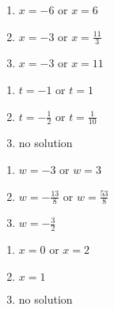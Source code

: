 \documentclass{ximera}
\begin{document}
\begin{multicols}{3}
\begin{enumerate}

\setcounter{enumi}{\value{HW}}

\item  $x = -6$ or $x=6$

\item $x = -3$ or $x= \frac{11}{3}$

\item $x = -3$ or $x= 11$

\setcounter{HW}{\value{enumi}}
\end{enumerate}
\end{multicols}

\begin{multicols}{3}
\begin{enumerate}
\setcounter{enumi}{\value{HW}}

\item  $t = -1$ or $t= 1$

\item $t=-\frac{1}{2}$ or $t= \frac{1}{10}$

\item no solution

\setcounter{HW}{\value{enumi}}
\end{enumerate}
\end{multicols}

\begin{multicols}{3}
\begin{enumerate}
\setcounter{enumi}{\value{HW}}

\item  $w=-3$ or $w= 3$

\item $w = -\frac{13}{8}$ or $w = \frac{53}{8}$

\item $w =-\frac{3}{2}$

\setcounter{HW}{\value{enumi}}
\end{enumerate}
\end{multicols}


\begin{multicols}{3}
\begin{enumerate}
\setcounter{enumi}{\value{HW}}

\item  $x=0$ or $x= 2$

\item  $x=1$

\item  no solution

\setcounter{HW}{\value{enumi}}
\end{enumerate}
\end{multicols}
\end{document}
